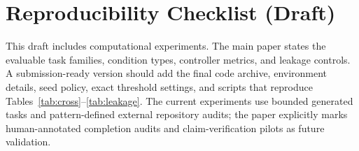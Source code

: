 \documentclass[letterpaper,10pt,twocolumn]{article}
\begin{document}



\clearpage
\onecolumn
\section*{Reproducibility Checklist (Draft)}

This draft includes computational experiments. The main paper states the
evaluable task families, condition types, controller metrics, and leakage
controls. A submission-ready version should add the final code archive,
environment details, seed policy, exact threshold settings, and scripts that
reproduce Tables~\ref{tab:cross}--\ref{tab:leakage}. The current experiments use
bounded generated tasks and pattern-defined external repository audits; the
paper explicitly marks human-annotated completion audits and claim-verification
pilots as future validation.
\end{document}
